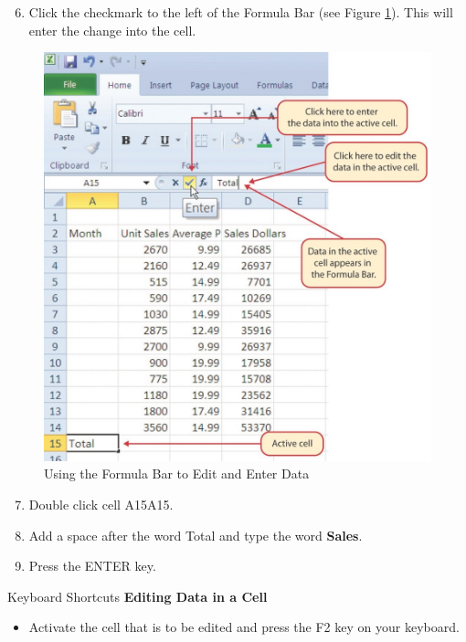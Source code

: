 \begin{enumerate}
	\setcounter{enumi}{5}
	\item Click the checkmark to the left of the Formula Bar (see Figure \ref{01:fig17}). This will enter the change into the cell.
\end{enumerate}

\begin{figure}[H]
	\centering
	\includegraphics[width=\maxwidth{.95\linewidth}]{gfx/ch01_fig17}
	\caption{Using the Formula Bar to Edit and Enter Data}
	\label{01:fig17}
\end{figure}

\begin{enumerate}
	\setcounter{enumi}{6}
	\item Double click cell A15\textsf{A15}.
	\item Add a space after the word Total and type the word \textbf{Sales}.
	\item Press the ENTER key.
\end{enumerate}

\begin{center}
	\begin{shtcutbox}{Keyboard Shortcuts}
		\textbf{Editing Data in a Cell}
		\\
		\begin{itemize}
			\setlength{\itemsep}{0pt}
			\setlength{\parskip}{0pt}
			\setlength{\parsep}{0pt}
			
			\item Activate the cell that is to be edited and press the \textsf{F2} key on your keyboard.
			
		\end{itemize}
	\end{shtcutbox}
\end{center}

